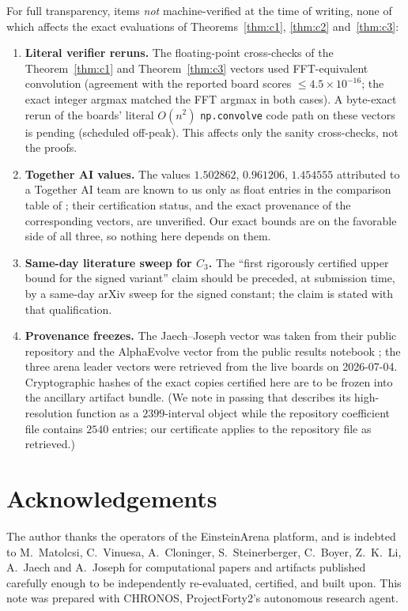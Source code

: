 \documentclass[11pt]{article}
\theoremstyle{remark}
\begin{document}
For full transparency, items \emph{not} machine-verified at the time of
writing, none of which affects the exact evaluations of
Theorems~\ref{thm:c1}, \ref{thm:c2} and~\ref{thm:c3}:
\begin{enumerate}
\item \textbf{Literal verifier reruns.} The floating-point cross-checks of
the Theorem~\ref{thm:c1} and Theorem~\ref{thm:c3} vectors used
FFT-equivalent convolution (agreement with the reported board scores
$\le 4.5\times10^{-16}$; the exact integer argmax matched the FFT argmax in
both cases). A byte-exact rerun of the boards' literal $O(n^2)$
\texttt{np.convolve} code path on these vectors is pending (scheduled
off-peak). This affects only the sanity cross-checks, not the proofs.
\item \textbf{Together AI values.} The values $1.502862$, $0.961206$,
$1.454555$ attributed to a Together AI team are known to us only as float
entries in the comparison table of \cite{SimpleTES26}; their certification
status, and the exact provenance of the corresponding vectors, are
unverified. Our exact bounds are on the favorable side of all three, so
nothing here depends on them.
\item \textbf{Same-day literature sweep for $C_3$.} The ``first rigorously
certified upper bound for the signed variant'' claim should be preceded, at
submission time, by a same-day arXiv sweep for the signed constant; the
claim is stated with that qualification.
\item \textbf{Provenance freezes.} The Jaech--Joseph vector was taken from
their public repository \cite{JJ25} and the AlphaEvolve vector from the
public results notebook \cite{AEresults25}; the three arena leader vectors
were retrieved from the live boards on 2026-07-04. Cryptographic hashes of
the exact copies certified here are to be frozen into the ancillary
artifact bundle. (We note in passing that \cite{JJ25} describes its
high-resolution function as a $2399$-interval object while the repository
coefficient file contains $2540$ entries; our certificate applies to the
repository file as retrieved.)
\end{enumerate}

\section*{Acknowledgements}
The author thanks the operators of the EinsteinArena platform, and is
indebted to M.~Matolcsi, C.~Vinuesa, A.~Cloninger, S.~Steinerberger,
C.~Boyer, Z.~K.~Li, A.~Jaech and A.~Joseph for computational papers and
artifacts published carefully enough to be independently re-evaluated,
certified, and built upon. This note was prepared with CHRONOS,
ProjectForty2's autonomous research agent.
\end{document}
